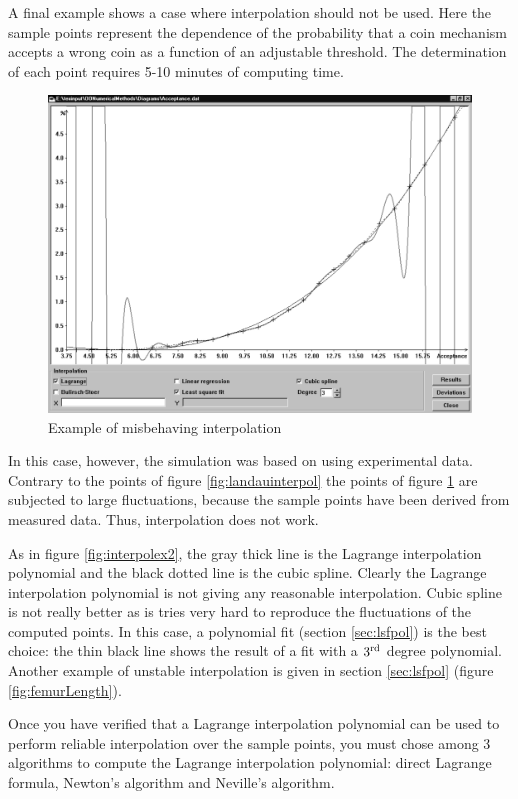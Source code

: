 \documentclass[twoside]{book}
\begin{document}
A final example shows a case where interpolation should not be
used. Here the sample points represent the dependence of the
probability that a coin mechanism accepts a wrong coin as a
function of an adjustable threshold. The determination of each
point requires 5-10 minutes of computing time.
\begin{figure}
\label{fig:interpolex4}
\centering\includegraphics[width=12cm]{Figures/BadInterpolation}
\caption{Example of misbehaving interpolation}
\end{figure}
In this case, however, the simulation was based on using
experimental data. Contrary to the points of figure
\ref{fig:landauinterpol} the points of figure
\ref{fig:interpolex4} are subjected to large fluctuations, because
the sample points have been derived from measured data. Thus,
interpolation does not work.

As in figure \ref{fig:interpolex2}, the gray thick line is the
Lagrange interpolation polynomial and the black dotted line is the
cubic spline. Clearly the Lagrange interpolation polynomial is not
giving any reasonable interpolation. Cubic spline is not really
better as is tries very hard to reproduce the fluctuations of the
computed points. In this case, a polynomial fit (\cf section
\ref{sec:lsfpol}) is the best choice: the thin black line shows
the result of a fit with a $3^{\mathop{\rm rd}}$ degree
polynomial. Another example of unstable interpolation is given in
section \ref{sec:lsfpol} (figure \ref{fig:femurLength}).

 Once
you have verified that a Lagrange interpolation polynomial can be
used to perform reliable interpolation over the sample points, you
must chose among 3 algorithms to compute the Lagrange
interpolation polynomial: direct Lagrange formula, Newton's
algorithm and Neville's algorithm.
\end{document}
